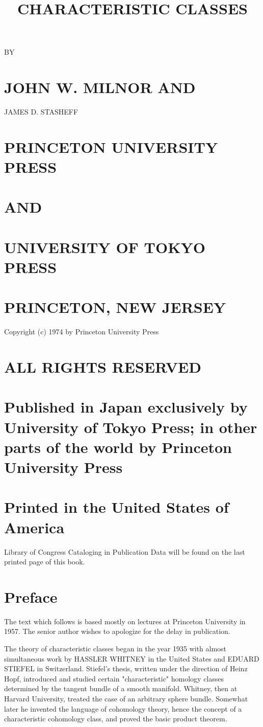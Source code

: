 \documentclass[10pt]{article}
\title{CHARACTERISTIC CLASSES}
\author{}
\date{}
\begin{document}
\maketitle
BY

\section{JOHN W. MILNOR 
 AND}
JAMES D. STASHEFF

\section{PRINCETON UNIVERSITY PRESS}
\section{AND}
\section{UNIVERSITY OF TOKYO PRESS}
\section{PRINCETON, NEW JERSEY}
Copyright (c) 1974 by Princeton University Press

\section{ALL RIGHTS RESERVED}
\section{Published in Japan exclusively by University of Tokyo Press; in other parts of the world by Princeton University Press}
\section{Printed in the United States of America}
Library of Congress Cataloging in Publication Data will be found on the last printed page of this book.

\section{Preface}
The text which follows is based mostly on lectures at Princeton University in 1957. The senior author wishes to apologize for the delay in publication.

The theory of characteristic classes began in the year 1935 with almost simultaneous work by HASSLER WHITNEY in the United States and EDUARD STIEFEL in Switzerland. Stiefel's thesis, written under the direction of Heinz Hopf, introduced and studied certain "characteristic" homology classes determined by the tangent bundle of a smooth manifold. Whitney, then at Harvard University, treated the case of an arbitrary sphere bundle. Somewhat later he invented the language of cohomology theory, hence the concept of a characteristic cohomology class, and proved the basic product theorem.
\end{document}
